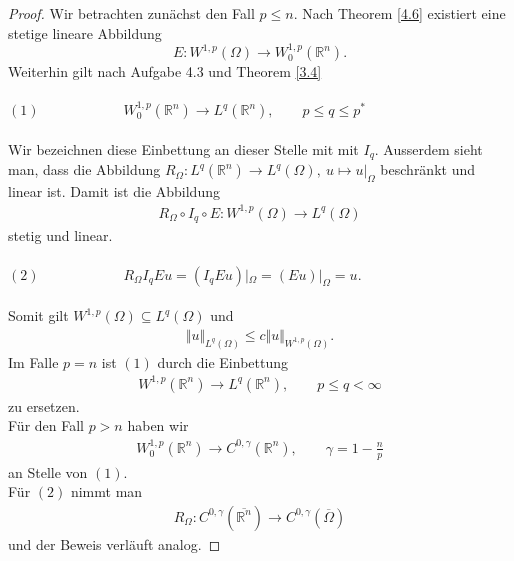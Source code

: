 \documentclass[
paper=a4,
bibtotocnumbered,
liststotocnumbered,
tablecaptionabove,
pointlessnumbers,
twoside,
openright,
10pt
]
{report}
\theoremstyle{definition}
\numberwithin{equation}{chapter}
\begin{document}
\begin{proof}
Wir betrachten zunächst den Fall $p \leq n$. Nach Theorem \ref{4.6} existiert eine stetige lineare Abbildung
\begin{equation*}
E:W^{1,p} (\Omega) \rightarrow W_0^{1,p}(\mathbb{R}^n).
\end{equation*}
Weiterhin gilt nach Aufgabe 4.3 und Theorem \ref{3.4}
\\
\\
$(1) \qquad \qquad \qquad W_0^{1,p}(\mathbb{R}^n) \rightarrow L^q (\mathbb{R}^n), \qquad p \leq q \leq p^*$
\\
\\ Wir bezeichnen diese Einbettung an dieser Stelle mit mit $I_q$. Ausserdem sieht man, dass die Abbildung 
 $R_{\Omega}: L^q(\mathbb{R}^n) \rightarrow  L^q(\Omega), \ u \mapsto u|_{\Omega}$ beschränkt und linear ist. Damit ist die Abbildung
\begin{align*}
 R_{\Omega} \circ  I_q \circ E: W^{1,p}(\Omega) \rightarrow L^q (\Omega)
 \end{align*}
 stetig und linear.
 \\
 \\
 $(2) \qquad \qquad \qquad R_{\Omega} I_q E u = (I_q E u)|_{\Omega} = (Eu)|_{\Omega} = u.$
 \\
 \\
 Somit gilt $W^{1,p}(\Omega) \subseteq L^q(\Omega)$ und 
 \begin{align*}
 \Vert u \Vert_{L^q(\Omega)} \leq c \Vert u \Vert_{W^{1,p}(\Omega)}.
 \end{align*}
 Im Falle $p=n$ ist $(1)$ durch die Einbettung 
 \begin{align*}
 W^{1,p}(\mathbb{R}^n) \rightarrow L^q (\mathbb{R}^n), \qquad p \leq q < \infty
 \end{align*}
 zu ersetzen. 
 \\ Für den Fall $p >n$ haben wir 
 \begin{align*}
 W_0^{1,p}(\mathbb{R}^n) \rightarrow C^{0,\gamma}(\mathbb{R}^n), \qquad \gamma = 1 - \frac{n}{p}
 \end{align*}
 an Stelle von $(1)$.
 \\ Für $(2)$ nimmt man
 \begin{align*}
 R_{\Omega}: C^{0,\gamma} (\overline{\mathbb{R}^n}) \rightarrow C^{0,\gamma} (\overline{\Omega})
 \end{align*}
 und der Beweis verläuft analog.
\end{proof}
\end{document}

